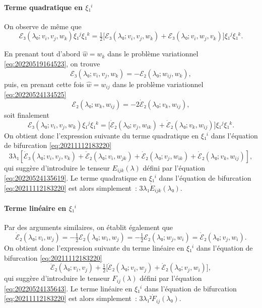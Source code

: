 \documentclass[12pt, final]{scrartcl}
\theoremstyle{definition}
\begin{document}
\paragraph{Terme quadratique en \(ξ₁^i\)} On observe de même que
\begin{equation}
  ℰ₃(λ₀; v_i, v_j, w_k) ξ₁^j ξ₁^k = \tfrac{1}{2} \bigl[ℰ₃(λ₀; v_i, v_j, w_k) + ℰ₃(λ₀; v_i, w_j, v_k)\bigr] ξ₁^j ξ₁^k.
\end{equation}

En prenant tout d'abord \(\hat{w} = w_k\) dans le problème variationnel
\eqref{eq:20220519164523}, on trouve
\begin{equation}
  ℰ₃(λ₀; v_i, v_j, w_k) = -ℰ₂(λ₀ ; w_{i j}, w_k),
\end{equation}
puis, en prenant cette fois \(\hat{w} = w_{i j}\) dans le problème variationnel
\eqref{eq:20220524134525}
\begin{equation}
  ℰ₂(λ₀; w_k, w_{i j}) = - 2 \dot{ℰ}₂(λ₀; v_k, w_{i j}),
\end{equation}
soit finalement
\begin{equation}
  ℰ₃(λ₀; v_i, v_j, w_k) ξ₁^j ξ₁^k = \bigl[\dot{ℰ}₂(λ₀; v_j, w_{i k}) + \dot{ℰ}₂(λ₀; v_k, w_{i j})\bigr] ξ₁^j ξ₁^k.
\end{equation}
On obtient donc l'expression suivante du terme quadratique en \(ξ₁^i\) dans
l'équation de bifurcation \eqref{eq:20211112183220}
\begin{equation}
  3 λ₁ [\dot{ℰ}₃(λ₀; v_i, v_j, v_k) + \dot{ℰ}₂(λ₀; v_i, w_{j k}) + \dot{ℰ}₂(λ₀; v_j, w_{i k}) + \dot{ℰ}₂(λ₀; v_k, w_{i j})],
\end{equation}
qui suggère d'introduire le tenseur \(E_{ijk}(λ)\) défini par l'équation
\eqref{eq:20220524135619}. Le terme quadratique en \(ξ₁^i\) dans l'équation de
bifurcation \eqref{eq:20211112183220} est alors simplement~:
\(3 λ₁ \dot{E}_{ijk}(λ₀)\).

\paragraph{Terme linéaire en \(ξ₁^i\)} Par des arguments similaires, on établit
également que
\begin{equation}
  \dot{ℰ}₂(λ₀; v_i, w_j) = - \tfrac{1}{2} ℰ₂(λ₀; w_i, w_j) = - \tfrac{1}{2} ℰ₂(λ₀; w_j, w_i) = \dot{ℰ}₂(λ₀; v_j, w_i).
\end{equation}
On obtient donc l'expression suivante du terme linéaire en \(ξ₁^i\) dans
l'équation de bifurcation \eqref{eq:20211112183220}
\begin{equation}
  \ddot{ℰ}₂(λ₀; v_i, v_j) + \tfrac{1}{2}\bigl[\dot{ℰ}₂(λ₀; v_i, w_j) + \dot{ℰ}₂(λ₀; v_j, w_i)\bigr],
\end{equation}
qui suggère d'introduire le tenseur \(F_{i j}(λ)\) défini par l'équation
\eqref{eq:20220524135643}. Le terme linéaire en \(ξ₁^i\) dans l'équation de
bifurcation \eqref{eq:20211112183220} est alors simplement~:
\(3 λ₁² \dot{F}_{i j}(λ₀)\).
\end{document}
